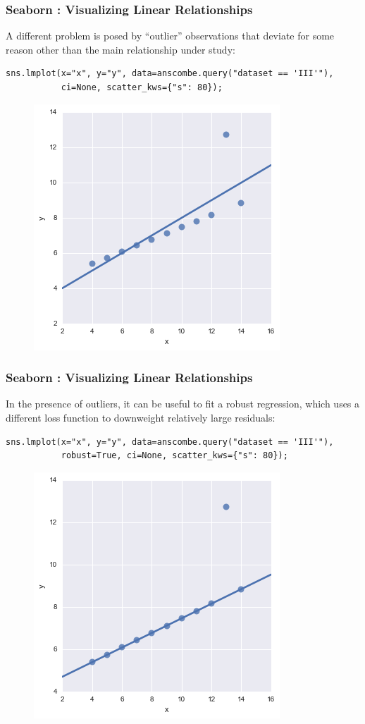 \documentclass{beamer}
\begin{document}
\begin{frame}[fragile]
		\frametitle{Seaborn : Visualizing Linear Relationships}
	\large
A different problem is posed by “outlier” observations that deviate for some reason other than the main relationship under study:
\begin{framed}
\begin{verbatim}
sns.lmplot(x="x", y="y", data=anscombe.query("dataset == 'III'"),
           ci=None, scatter_kws={"s": 80});
               \end{verbatim}
            \end{framed}
\begin{figure}
	\centering
	\includegraphics[width=0.55\linewidth]{images/regression_25_0}
\end{figure}


\end{frame}
\begin{frame}[fragile]
		\frametitle{Seaborn : Visualizing Linear Relationships}
		\large
In the presence of outliers, it can be useful to fit a robust regression, which uses a different loss function to downweight relatively large residuals:
\begin{framed}
\begin{verbatim}
sns.lmplot(x="x", y="y", data=anscombe.query("dataset == 'III'"),
           robust=True, ci=None, scatter_kws={"s": 80});
               \end{verbatim}
            \end{framed}
\begin{figure}
	\centering
	\includegraphics[width=0.55\linewidth]{images/regression_27_0}

\end{figure}
\end{frame}
\end{document}
